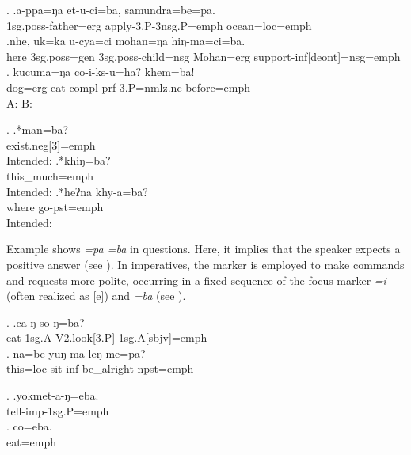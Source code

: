 \ex. \ag.a-ppa=ŋa et-u-ci=ba, samundra=be=pa.\\
 {\sc 1sg.poss-}father{\sc =erg} apply{\sc [3sg.A;pst]-3.P-3nsg.P=emph} ocean{\sc =loc=emph}\\
  
\bg.nhe, uk=ka          u-cya=ci               mohan=ŋa      hiŋ-ma=ci=ba.\\
here {\sc 3sg.poss=gen} {\sc 3sg.poss-}child{\sc =nsg} Mohan{\sc =erg} support{\sc -inf[deont]=nsg=emph}\\
 \bg. kucuma=ŋa co-i-ks-u=ha?  khem=ba!\\
dog{\sc =erg} eat{\sc -compl-prf-3.P=nmlz.nc} before{\sc =emph}\\
 A:  B:  
  
  \ex. \ag.*man=ba?\\
  {\sc exist.neg[3]=emph}\\
  Intended: 
  \bg.*khiŋ=ba?\\
  this\_much{\sc =emph}\\
   Intended: 
    \bg.*heʔna khy-a=ba?\\
  where go{\sc [3sg]-pst=emph}\\
   Intended: 
  
  
Example \Next shows \emph{=pa \ti =ba} in  questions. Here, it implies that the speaker expects a positive answer (see \Next).  In imperatives, the marker is employed to make commands and requests more polite, occurring in a fixed sequence of the focus marker \emph{=i} (often realized as [e]) and \emph{=ba} (see \NNext).

\ex. \ag.ca-ŋ-so-ŋ=ba?\\
 eat{\sc [3.P]-1sg.A-V2.look[3.P]-1sg.A[sbjv]=emph}\\
  
\bg. na=be yuŋ-ma leŋ-me=pa?\\
this{\sc =loc} sit{\sc -inf} be\_alright{\sc [3sg]-npst=emph}\\

 \ex. \ag.yokmet-a-ŋ=eba.\\
 tell{\sc -imp-1sg.P=emph}\\
 \bg.  co=eba.\\
 eat{\sc [imp]=emph}\\
 
